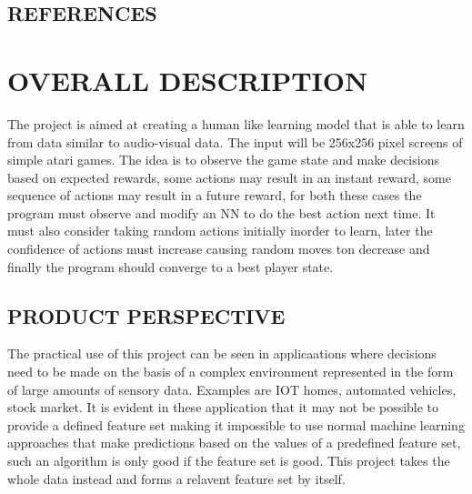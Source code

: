 \documentclass[twoside,letterpaper]{article}
\begin{document}
\subsection[REFERENCES]{\rmfamily\bfseries\color{black}
REFERENCES}
\nocite{*} 
{\color{black}


\section[OVERALL
DESCRIPTION]{\rmfamily\bfseries\color{black}
OVERALL DESCRIPTION}

{\color{black}
The project is aimed at creating a human like learning model that is able to learn from data similar to audio-visual data. The input will be 256x256 pixel screens of simple atari games. The idea is to observe the game state and make decisions based on expected rewards, some actions may result in an instant reward, some sequence of actions may result in a future reward, for both these cases the program must observe and modify an NN to do the best action next time. It must also consider taking random actions initially inorder to learn, later the confidence of actions must increase causing random moves ton decrease and finally the program should converge to a best player state.}
\subsection[PRODUCT
PERSPECTIVE]{\rmfamily\bfseries\color{black}
PRODUCT PERSPECTIVE}


{\color{black}
The practical use of this project can be seen in applicaations where decisions need to be made on the basis of a complex environment represented in the form of large amounts of sensory data. Examples are IOT homes, automated vehicles, stock market. It is evident in these application that it may not be possible to provide a defined feature set making it impossible to use normal machine learning approaches that make predictions based on the values of a predefined feature set, such an algorithm is only good if the feature set is good. This project takes the whole data instead and forms a relavent feature set by itself.}

}
\end{document}

